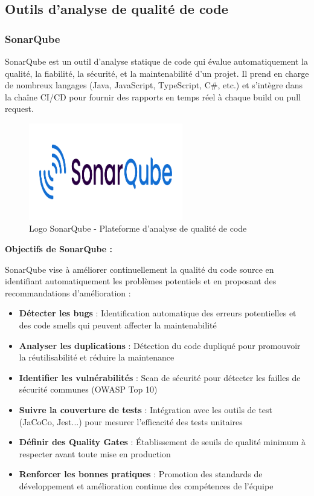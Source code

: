 \documentclass[12pt,a4paper]{report}
\begin{document}
\subsection{Outils d'analyse de qualité de code}

\subsubsection{SonarQube}

SonarQube est un outil d'analyse statique de code qui évalue automatiquement la qualité, la fiabilité, la sécurité, et la maintenabilité d'un projet. Il prend en charge de nombreux langages (Java, JavaScript, TypeScript, C\#, etc.) et s'intègre dans la chaîne CI/CD pour fournir des rapports en temps réel à chaque build ou pull request.

\begin{figure}[htbp]
    \centering
    \includegraphics[width=0.6\textwidth]{latex_media/media/sonarqube.png}
    \caption{Logo SonarQube - Plateforme d'analyse de qualité de code}
    \label{fig:sonarqube-logo}
\end{figure}

\textbf{Objectifs de SonarQube :}

SonarQube vise à améliorer continuellement la qualité du code source en identifiant automatiquement les problèmes potentiels et en proposant des recommandations d'amélioration :

\begin{itemize}
    \item \textbf{Détecter les bugs} : Identification automatique des erreurs potentielles et des code smells qui peuvent affecter la maintenabilité
    \item \textbf{Analyser les duplications} : Détection du code dupliqué pour promouvoir la réutilisabilité et réduire la maintenance
    \item \textbf{Identifier les vulnérabilités} : Scan de sécurité pour détecter les failles de sécurité communes (OWASP Top 10)
    \item \textbf{Suivre la couverture de tests} : Intégration avec les outils de test (JaCoCo, Jest...) pour mesurer l'efficacité des tests unitaires
    \item \textbf{Définir des Quality Gates} : Établissement de seuils de qualité minimum à respecter avant toute mise en production
    \item \textbf{Renforcer les bonnes pratiques} : Promotion des standards de développement et amélioration continue des compétences de l'équipe
\end{itemize}
\end{document}

